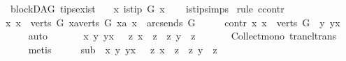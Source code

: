 \begin{isabellebody}
{\isafolddocument}%
%
\isadelimdocument
%
\endisadelimdocument
{}\isamarkupfalse%
\ {\isacharparenleft}{\kern0pt}\ blockDAG{\isacharparenright}{\kern0pt}\ tips{\isacharunderscore}{\kern0pt}exist{\isacharcolon}{\kern0pt}\ \isanewline
\ \ {\isachardoublequoteopen}{\isasymexists}x{\isachardot}{\kern0pt}\ is{\isacharunderscore}{\kern0pt}tip\ G\ x{\isachardoublequoteclose}\isanewline
%
\isadelimproof
\ \ %
\endisadelimproof
%
\isatagproof
{}\isamarkupfalse%
\ is{\isacharunderscore}{\kern0pt}tip{\isachardot}{\kern0pt}simps\isanewline
{}\isamarkupfalse%
\ {\isacharparenleft}{\kern0pt}rule\ ccontr{\isacharparenright}{\kern0pt}\isanewline
\ \ \isamarkupfalse%
\ {\isachardoublequoteopen}{\isasymnexists}x{\isachardot}{\kern0pt}\ x\ {\isasymin}\ verts\ G\ {\isasymand}{\isacharparenleft}{\kern0pt}{\isasymforall}xa{\isasymin}verts\ G{\isachardot}{\kern0pt}\ {\isacharparenleft}{\kern0pt}xa{\isacharcomma}{\kern0pt}\ x{\isacharparenright}{\kern0pt}\ {\isasymnotin}\ {\isacharparenleft}{\kern0pt}arcs{\isacharunderscore}{\kern0pt}ends\ G{\isacharparenright}{\kern0pt}\isactrlsup {\isacharplus}{\kern0pt}{\isacharparenright}{\kern0pt}{\isachardoublequoteclose}\isanewline
\ \ \isamarkupfalse%
\ \isamarkupfalse%
\ contr{\isacharcolon}{\kern0pt}\ {\isachardoublequoteopen}{\isasymforall}x{\isachardot}{\kern0pt}\ x\ {\isasymin}\ verts\ G\ {\isasymlongrightarrow}\ {\isacharparenleft}{\kern0pt}{\isasymexists}y{\isachardot}{\kern0pt}\ y{\isasymrightarrow}\isactrlsup {\isacharplus}{\kern0pt}x{\isacharparenright}{\kern0pt}{\isachardoublequoteclose}\isanewline
\ \ \ \ \isamarkupfalse%
\ auto\ \ \isanewline
\ \ \isamarkupfalse%
\ {\isachardoublequoteopen}{\isasymforall}\ x\ y{\isachardot}{\kern0pt}\ y{\isasymrightarrow}\isactrlsup {\isacharplus}{\kern0pt}x\ {\isasymlongrightarrow}\ \ {\isacharbraceleft}{\kern0pt}z{\isachardot}{\kern0pt}\ x\ {\isasymrightarrow}\isactrlsup {\isacharplus}{\kern0pt}\ z{\isacharbraceright}{\kern0pt}\ {\isasymsubseteq}\ {\isacharbraceleft}{\kern0pt}z{\isachardot}{\kern0pt}\ y\ {\isasymrightarrow}\isactrlsup {\isacharplus}{\kern0pt}\ z{\isacharbraceright}{\kern0pt}{\isachardoublequoteclose}\isanewline
\ \ \ \ \isamarkupfalse%
\ \ Collect{\isacharunderscore}{\kern0pt}mono\ trancl{\isacharunderscore}{\kern0pt}trans\isanewline
\ \ \ \ \isamarkupfalse%
\ metis\isanewline
\ \ \isamarkupfalse%
\ \isamarkupfalse%
\ sub{\isacharcolon}{\kern0pt}\ {\isachardoublequoteopen}{\isasymforall}\ x\ y{\isachardot}{\kern0pt}\ y{\isasymrightarrow}\isactrlsup {\isacharplus}{\kern0pt}x\ {\isasymlongrightarrow}\ \ {\isacharbraceleft}{\kern0pt}z{\isachardot}{\kern0pt}\ x\ {\isasymrightarrow}\isactrlsup {\isacharplus}{\kern0pt}\ z{\isacharbraceright}{\kern0pt}\ {\isasymsubset}\ {\isacharbraceleft}{\kern0pt}z{\isachardot}{\kern0pt}\ y\ {\isasymrightarrow}\isactrlsup {\isacharplus}{\kern0pt}\ z{\isacharbraceright}{\kern0pt}{\isachardoublequoteclose}\isanewline

\end{isabellebody}
